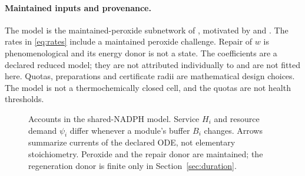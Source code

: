 \documentclass[11pt,a4paper]{article}
\theoremstyle{plain}
\theoremstyle{definition}
\theoremstyle{remark}
\newcommand{\HG}{H_G}
\newcommand{\HT}{H_T}
\begin{document}
\paragraph{Maintained inputs and provenance.}
The model is the maintained-peroxide subnetwork of \citep{companionNADPH},
motivated by \citet{adimora2010} and \citet{pannala2015}. The rates in
\eqref{eq:rates} include a maintained peroxide challenge. Repair of $w$ is
phenomenological and its energy donor is not a state. The coefficients are a
declared reduced model; they are not attributed individually to
\citep{adimora2010} and are not fitted here. Quotas, preparations and
certificate radii are mathematical design choices. The model is not a
thermochemically closed cell, and the quotas are not health thresholds.

\begin{figure}[t]\centering
{}
\caption{Accounts in the shared-NADPH model. Service $H_i$ and resource demand
$\psi_i$ differ whenever a module's buffer $B_i$ changes. Arrows summarize
currents of the declared ODE, not elementary stoichiometry. Peroxide and the
repair donor are maintained; the regeneration donor is finite only in
Section~\ref{sec:duration}.}
\label{fig:accounts}
\end{figure}
\end{document}
